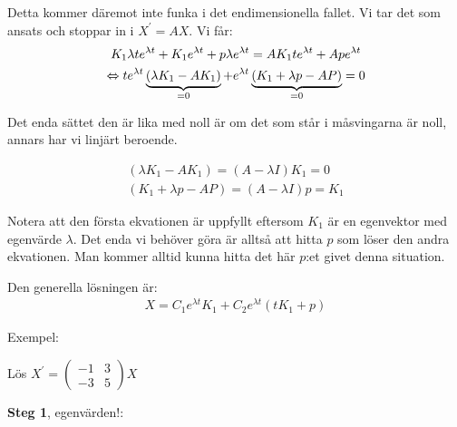 \noindent Detta kommer däremot inte funka i det endimensionella fallet. Vi tar det som ansats och stoppar in i $X^{\prime} = AX$. Vi får:
\begin{equation*}
  \begin{gathered}
    K_1\lambda te^{\lambda t}+K_1e^{\lambda t}+p\lambda e^{\lambda t}= AK_1te^{\lambda t} + Ape^{\lambda t}\\
    \Leftrightarrow te^{\lambda t}\underbrace{\left(\lambda K_1-AK_1\right)}_{\text{=0}}+e^{\lambda t}\underbrace{\left(K_1+\lambda p-AP\right)}_{\text{=0}}=0
  \end{gathered}
\end{equation*}\par
\noindent Det enda sättet den är lika med noll är om det som står i måsvingarna är noll, annars har vi linjärt beroende.
\par\bigskip

\begin{equation*}
  \begin{gathered}
    \left(\lambda K_1-AK_1\right) = (A-\lambda I)K_1 = 0\\
    \left(K_1+\lambda p-AP\right) = (A-\lambda I)p=K_1
  \end{gathered}
\end{equation*}\par
\noindent Notera att den första ekvationen är uppfyllt eftersom $K_1$ är en egenvektor med egenvärde $\lambda$. Det enda vi behöver göra är alltså att hitta $p$ som löser den andra ekvationen. Man kommer alltid kunna hitta det här $p$:et givet denna situation.\par
\noindent Den generella lösningen är:
\begin{equation*}
  \begin{gathered}
    X = C_1e^{\lambda t}K_1 + C_2e^{\lambda t}(tK_1+p)
  \end{gathered}
\end{equation*}
\par\bigskip
\noindent Exempel:\par
\noindent Lös $X^{\prime} = \begin{pmatrix}-1&3\\-3&5\end{pmatrix}X$
\par\bigskip
\noindent\textbf{Steg 1}, egenvärden!:

